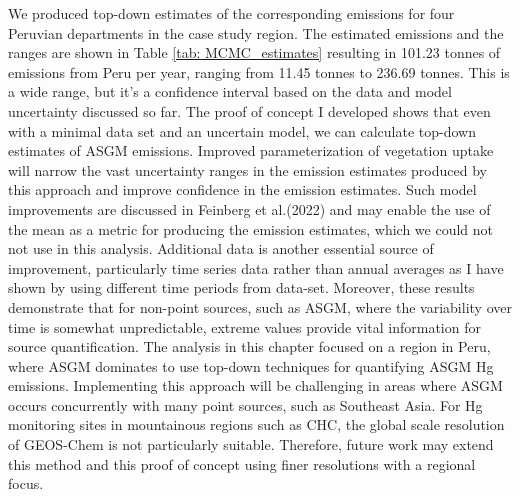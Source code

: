 \begin{flushleft}
  We produced top-down estimates of the corresponding emissions for four Peruvian departments in the case study region. The estimated emissions and the ranges are shown in Table \ref{tab: MCMC_estimates} resulting in 101.23 tonnes of emissions from Peru per year, ranging from 11.45 tonnes to 236.69 tonnes. This is a wide range, but it's a confidence interval based on the data and model uncertainty discussed so far. The proof of concept I developed shows that even with a minimal data set and an uncertain model, we can calculate top-down estimates of ASGM \hg emissions. Improved parameterization of vegetation uptake will narrow the vast uncertainty ranges in the emission estimates produced by this approach and improve confidence in the \hg emission estimates. Such model improvements are discussed in Feinberg et al.(2022)\cite{feinberg_evaluating_2022} and may enable the use of the mean as a metric for producing the \hg emission estimates, which we could not not use in this analysis. Additional data is another essential source of improvement, particularly time series data rather than annual averages as I have shown by using different time periods from \obsC data-set. Moreover, these results demonstrate that for non-point sources, such as ASGM, where the variability over time is somewhat unpredictable, extreme values provide vital information for source quantification. The analysis in this chapter focused on a region in Peru, where ASGM dominates to use top-down techniques for quantifying ASGM Hg emissions. Implementing this approach will be challenging in areas where ASGM occurs concurrently with many point sources, such as Southeast Asia. For Hg monitoring sites in mountainous regions such as CHC, the global scale resolution of GEOS-Chem is not particularly suitable. Therefore, future work may extend this method and this proof of concept using finer resolutions with a regional focus.
\end{flushleft}


